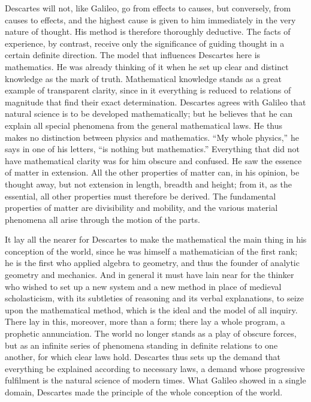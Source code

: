 \documentclass[12pt]{book}
\newcommand{\opage}[1]{\marginnote{\footnotesize\textit{[#1]}}}
\begin{document}
Descartes will not, like Galileo, go from effects to causes, but conversely, from
causes to \opage{15}effects, and the highest cause is given to him immediately in the
very nature of thought. His method is therefore thoroughly deductive. The facts of
experience, by contrast, receive only the significance of guiding thought in a
certain definite direction. The model that influences Descartes here is mathematics.
He was already thinking of it when he set up clear and distinct knowledge as the mark
of truth. Mathematical knowledge stands as a great example of transparent clarity,
since in it everything is reduced to relations of magnitude that find their exact
determination. Descartes agrees with Galileo that natural science is to be developed
mathematically; but he believes that he can explain all special phenomena from the
general mathematical laws. He thus makes no distinction between physics and
mathematics. ``My whole physics,'' he says in one of his letters, ``is nothing but
mathematics.'' Everything that did not have mathematical clarity was for him obscure
and confused. He saw the essence of matter in extension. All the other properties of
matter can, in his opinion, be thought away, but not extension in length, breadth and
height; from it, as the essential, all other properties must therefore be derived.
The fundamental properties of matter are divisibility and mobility, and the various
material phenomena all arise through the motion of the parts.

It lay all the nearer for Descartes to make the mathematical the main thing in his
conception of the world, since he was himself a mathematician of the first rank; he
is the first who applied algebra to geometry, and thus the founder of analytic
\opage{16}geometry and mechanics. And in general it must have lain near for the thinker
who wished to set up a new system and a new method in place of medieval scholasticism,
with its subtleties of reasoning and its verbal explanations, to seize upon the
mathematical method, which is the ideal and the model of all inquiry. There lay in
this, moreover, more than a form; there lay a whole program, a prophetic annunciation.
The world no longer stands as a play of obscure forces, but as an infinite series of
phenomena standing in definite relations to one another, for which clear laws hold.
Descartes thus sets up the demand that everything be explained according to necessary
laws, a demand whose progressive fulfilment is the natural science of modern times.
What Galileo showed in a single domain, Descartes made the principle of the whole
conception of the world.
\end{document}
